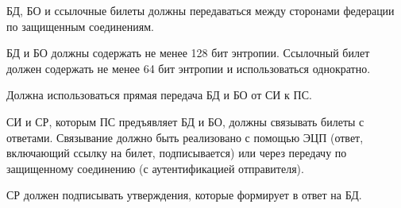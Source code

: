 
БД, БО и ссылочные билеты должны передаваться между сторонами федерации по 
защищенным соединениям. 

БД и БО должны содержать не менее 128 бит энтропии.
% 
Ссылочный билет должен содержать не менее 64 бит энтропии и использоваться 
однократно.

Должна использоваться прямая передача БД и БО от СИ к ПС.

СИ и СР, которым ПС предъявляет БД и БО, должны связывать билеты с ответами.
%
Связывание должно быть реализовано с помощью ЭЦП (ответ, включающий ссылку на 
билет, подписывается) или через передачу по защищенному соединению 
(с аутентификацией отправителя). 


СР должен подписывать утверждения, которые формирует в ответ на БД. 

